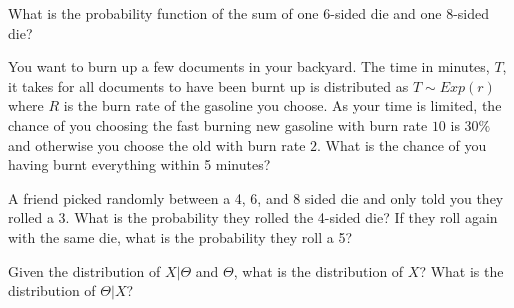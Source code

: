 \begin{problem}
	What is the probability function of the sum of one 6-sided die and one 8-sided die?
\end{problem}

\begin{problem} %
	You want to burn up a few documents in your backyard. The time in minutes, \(T\), it takes for all documents to have been burnt up is distributed as \(T \sim Exp(r)\) where \(R\) is the burn rate of the gasoline you choose. As your time is limited, the chance of you choosing the fast burning new gasoline with burn rate \(10\) is \(30\%\) and otherwise you choose the old with burn rate \(2\). What is the chance of you having burnt everything within 5 minutes?
\end{problem}

\begin{problem}
	A friend picked randomly between a 4, 6, and 8 sided die and only told you they rolled a 3. What is the probability they rolled the 4-sided die? If they roll again with the same die, what is the probability they roll a 5?
\end{problem}

\begin{problem}
	Given the distribution of \(X|\Theta\) and \(\Theta\), what is the distribution of \(X\)? What is the distribution of \(\Theta |X\)?
\end{problem}
